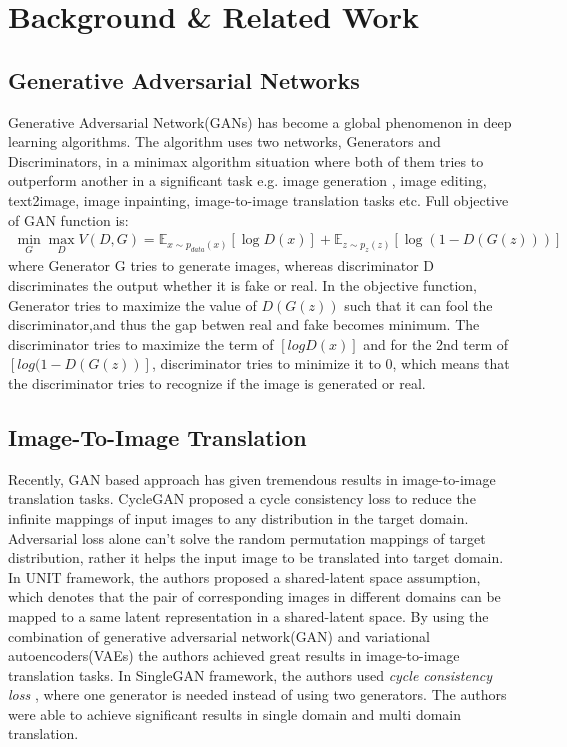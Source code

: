 \chapter{Background \& Related Work}


\section{Generative Adversarial Networks} \label{GAN}
Generative Adversarial Network(GANs)\cite{goodfellow2014generative} has become a global phenomenon in deep learning algorithms. The algorithm uses two networks, Generators and Discriminators, in a minimax algorithm situation where both of them tries to outperform another in a significant task e.g. image generation \cite{DBLP:journals/corr/RadfordMC15} \cite{DBLP:journals/corr/DentonCSF15}, image editing\cite{DBLP:journals/corr/ZhuKSE16}, text2image\cite{DBLP:journals/corr/ZhangXLZHWM16}, image inpainting\cite{DBLP:journals/corr/PathakKDDE16}, image-to-image translation tasks\cite{cyclegan} \cite{pix2pix} etc. Full objective of GAN function is:
\begin{align}
\min_G \max_D V(D, G)=\mathbb{E}_{x\sim p_{data}(x)}[\log D(x)] + \mathbb{E}_{z\sim p_z(z)}[\log(1 - D(G(z)))]
\end{align}
where Generator G tries to generate images, whereas discriminator D discriminates the output whether it is fake or real. In the objective function, Generator tries to maximize the value of $D(G(z))$ such that it can fool the discriminator,and thus the gap betwen real and fake becomes minimum. The discriminator tries to maximize the term of $[logD(x)]$ and for the 2nd term of $[log(1-D(G(z))]$, discriminator tries to minimize it to 0, which means that the discriminator tries to recognize if the image is generated or real.
\section{Image-To-Image Translation}
Recently, GAN based approach has given tremendous results in image-to-image translation tasks. CycleGAN\cite{cyclegan} proposed a cycle consistency loss to reduce the infinite mappings of input images to any distribution in the target domain. Adversarial loss alone can't solve the random permutation mappings of target distribution, rather it helps the input image to be translated into target domain.\\
In UNIT\cite{DBLP:journals/corr/LiuBK17} framework, the authors proposed a shared-latent space assumption, which denotes that the pair of corresponding images in different domains can be mapped to a same latent representation in a shared-latent space. By using the combination of generative adversarial network(GAN) and variational autoencoders(VAEs) the authors achieved great results in image-to-image translation tasks.
In SingleGAN\cite{SingleGAN} framework, the authors used \textit{cycle consistency loss} \cite{cyclegan}, where one generator is needed instead of using two generators\cite{cyclegan}.  The authors were able to achieve significant results in single domain and multi domain translation. 


